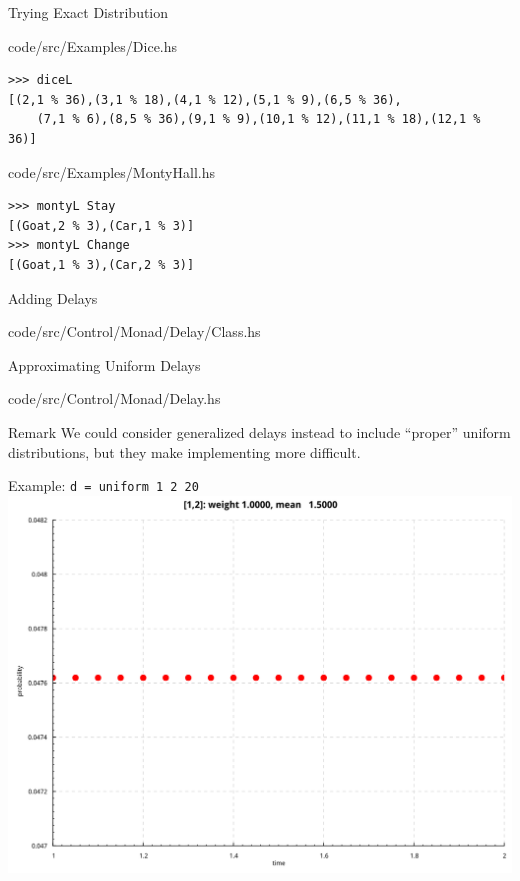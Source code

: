 ﻿\documentclass[aspectratio=169]{beamer}
\begin{document}
\begin{frame}[fragile]{Trying Exact Distribution}
    
        {code/src/Examples/Dice.hs}
    \begin{lstlisting}[backgroundcolor=\color{lightgray}]
>>> diceL
[(2,1 % 36),(3,1 % 18),(4,1 % 12),(5,1 % 9),(6,5 % 36),
    (7,1 % 6),(8,5 % 36),(9,1 % 9),(10,1 % 12),(11,1 % 18),(12,1 % 36)]
    \end{lstlisting}
\pause
    
        {code/src/Examples/MontyHall.hs}
    \begin{lstlisting}[backgroundcolor=\color{lightgray}]
>>> montyL Stay
[(Goat,2 % 3),(Car,1 % 3)]
>>> montyL Change
[(Goat,1 % 3),(Car,2 % 3)]
    \end{lstlisting}
\end{frame}

\begin{frame}{Adding Delays}
    
        {code/src/Control/Monad/Delay/Class.hs}
\end{frame}

\begin{frame}{Approximating Uniform Delays}
    
        {code/src/Control/Monad/Delay.hs}
    \pause
    \begin{block}{Remark}
        We could consider generalized delays instead to include ``proper''
        uniform distributions, but they make implementing more difficult.
    \end{block}
\end{frame}

\begin{frame}{Example: \tt d = uniform 1 2 20}
    \centering
    \includegraphics[height=0.8\textheight]{images/d.png}
\end{frame}
\end{document}
